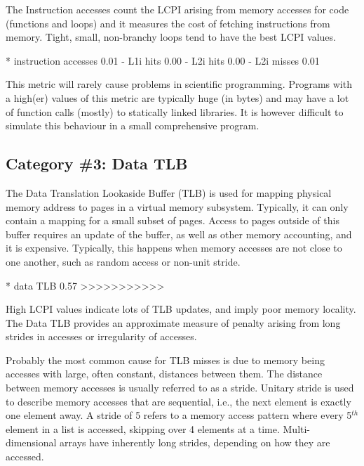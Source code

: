 The Instruction accesses count the LCPI arising from memory accesses for code (functions and loops) and it measures the cost of fetching instructions from memory. Tight, small, non-branchy loops tend to have the best LCPI values.

\begin{prompt}
* instruction accesses  0.01
 - L1i hits             0.00
 - L2i hits             0.00
 - L2i misses           0.01
\end{prompt}

This metric will rarely cause problems in scientific programming. Programs with a high(er) values of this metric are typically huge (in bytes) and may have a lot of function calls (mostly) to statically linked libraries. It is however difficult to simulate this behaviour in a small comprehensive program.

\subsection{Category \#3: Data TLB}
\label{ch02:subsec:CAT3_Data_TLB}

The Data Translation Lookaside Buffer (TLB) is used for mapping physical memory address to pages in a virtual memory subsystem. Typically, it can only contain a mapping for a small subset of pages. Access to pages outside of this buffer requires an update of the buffer, as well as other memory accounting, and it is expensive. Typically, this happens when memory accesses are not close to one another, such as random access or non-unit stride.

\begin{prompt}
* data TLB              0.57 >>>>>>>>>>>
\end{prompt}

High LCPI values indicate lots of TLB updates, and imply poor memory locality. The Data TLB provides an approximate measure of penalty arising from long strides in accesses or irregularity of accesses.

Probably the most common cause for TLB misses is due to memory being accesses with large, often constant, distances between them. The distance between memory accesses is usually referred to as a stride. Unitary stride is used to describe memory accesses that are sequential, i.e., the next element is exactly one element away. A stride of 5 refers to a memory access pattern where every 5${}^{th}$ element in a list is accessed, skipping over 4 elements at a time. Multi-dimensional arrays have inherently long strides, depending on how they are accessed.

